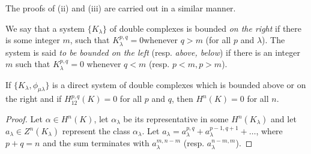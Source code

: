   The proofs of (ii) and (iii) are carried out in a similar
  manner. 
  
  \begin{defi*}%
We say that a system $\{ K_\lambda \}$ of double complexes is bounded
{\em on the right} if there is some integer $m$, such that
$K^{p,q}_\lambda = 0$\pageoriginale whenever $q > m$ (for all $p$ and
$\lambda$). The 
system is said {\em to be bounded on the left} (resp. {\em above,
  below}) if there is an integer $m$ such that $K^{p,q}_\lambda = 0$
whenever $q < m$ (resp. $p < m, p > m$). 
  \end{defi*}  

  \begin{proposition}\label{chap20:prop15}%
If $\bigg\{K_\lambda , \phi_{\mu \lambda} \bigg\}$  is a direct
  system of double complexes which is bounded above or on the right
  and if $H^{p,q}_{12}(K) = 0$ for all $p$ and $q$, then $H^n(K)
  = 0$ for all $n$. 
  \end{proposition}  

  \begin{proof}
	Let $\alpha \in H^n(K)$, let $\alpha_\lambda$ be its
        representative in some $H^n(K_\lambda)$ and let $a_\lambda \in
        Z^n(K_\lambda)$ represent the class $\alpha_{\lambda}$. Let $a_{\lambda}
        = a^{p,q}_{\lambda} + a^{p-1, q+1}_{\lambda} + \ldots$, where
        $p+q = n$ and the sum terminates with $a^{m,n-m}_{\lambda}$
        (resp. $a^{n-m, m}_{\lambda}$). 
  \end{proof}  
  
